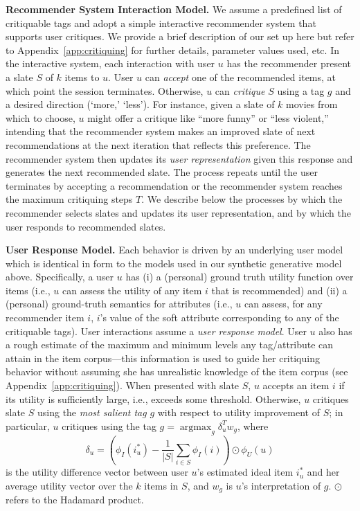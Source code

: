\documentclass[manuscript,screen,nonacm]{acmart}
\newcommand{\1}{{\mathbf 1}}
\DeclareMathOperator*{\argmax}{argmax}
\theoremstyle{TheoremNum}
\begin{document}
\vskip 2mm
\noindent
\textbf{Recommender System Interaction Model.} \hspace*{2mm}
We assume a predefined list of critiquable tags and adopt a simple interactive recommender system that supports user critiques. We provide a brief description of our set up here but refer to Appendix~\ref{app:critiquing} for further details, parameter values used, etc. In the interactive system, each interaction with user $u$ has the recommender present a slate $S$ of $k$ items to $u$. User $u$ can \emph{accept} one of the recommended items, at which point the session terminates. Otherwise, $u$ can \emph{critique} $S$ using a tag $g$ and a desired direction (`more,' `less'). For instance, given a slate of $k$ movies from which to choose, $u$ might offer a critique like ``more funny'' or ``less violent,'' intending that the recommender system makes an improved slate of next recommendations at the next iteration that reflects this preference. The recommender system then updates its \emph{user representation} given this response and generates the next recommended slate. The process repeats until the user terminates by accepting a recommendation or the recommender system reaches the maximum critiquing steps $T$. We describe below the processes by which the recommender selects slates and updates its user representation, and by which the user responds to recommended slates.

\vskip 2mm
\noindent
\textbf{User Response Model.} \hspace*{2mm}
Each behavior is driven by an underlying user model which is identical in form to the models used in our synthetic generative model above. Specifically, a user $u$ has (i) a (personal) ground truth utility function over items (i.e., $u$ can assess the utility of any item $i$ that is recommended) and (ii) a (personal) ground-truth semantics for attributes (i.e., $u$ can assess, for any recommender item $i$, $i$'s value of the soft attribute corresponding to any of the critiquable tags).
User interactions assume a \emph{user response model}.
User $u$ also has a rough estimate of the maximum and minimum levels any tag/attribute can attain in the item corpus---this information is used to guide her critiquing behavior without assuming she has unrealistic knowledge of the item corpus (see Appendix~\ref{app:critiquing}). When presented with slate $S$, $u$ accepts an item $i$ if its utility is sufficiently large, i.e., exceeds some threshold.
Otherwise, $u$ critiques slate $S$ using the \emph{most salient tag} $g$ with respect to utility improvement of $S$; in particular, $u$ critiques using the tag $g = \argmax_g \delta_u^T w_g $, where $$\delta_u=(\phi_I(i^*_u)-\frac{1}{|S|}\sum_{i\in S}\phi_I(i))\odot \phi_U(u)$$
is the utility difference vector between user $u$'s estimated ideal item $i^*_u$ and her average utility vector over the $k$ items in $S$, and $w_g$ is $u$'s interpretation of $g$. $\odot$ refers to the Hadamard product.
\end{document}
